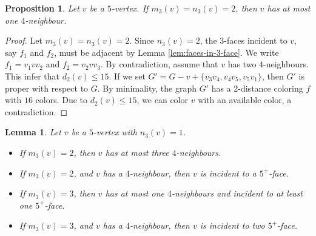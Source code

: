 \documentclass[12pt, reqno]{amsart}
\theoremstyle{plain}
\newtheorem{proposition}[equation]{Proposition}
\newtheorem{lemma}[equation]{Lemma}
\theoremstyle{definition}
\numberwithin{equation}{section}
\begin{document}
\begin{proposition}\label{prop:  v has two 4 neighbour}
Let $v$ be a $5$-vertex. If $m_3(v)=n_3(v)= 2$, then $v$ has at  most one $4$-neighbour. 
\end{proposition}
\begin{proof}
Let $m_3(v)=n_3(v)= 2$.  Since  $n_3(v)= 2$, the $3$-faces incident to $v$, say $f_1$ and $f_2$, must be adjacent by Lemma \ref{lem:faces-in-3-face}. We write  $f_1=v_1vv_2$ and $f_2=v_2vv_3$. By contradiction, assume that $v$ has two $4$-neighbours. This infer that $d_2(v)\leq 15$. If we set $G'=G-v+\{v_3v_4,v_4v_5,v_5v_1\}$, then $G'$ is proper with respect to $G$. By minimality, the graph $G'$ has a 2-distance coloring $f$ with $16$ colors. Due to $d_2(v)\leq 15$, we can color $v$ with an available color, a contradiction. 
\end{proof}




\begin{lemma}\label{lem:5-vertex-three-4-neigh}
Let $v$ be a $5$-vertex with  $n_3(v)= 1$. 
\begin{itemize}
\item[$(a)$] If $m_3(v)=2$, then $v$ has at  most three $4$-neighbours. 
\item[$(b)$] If $m_3(v)=2$, and $v$ has a $4$-neighbour, then  $v$ is incident to a $5^+$-face. 
\item[$(c)$] If $m_3(v)=3$, then  $v$ has at  most one $4$-neighbours and incident to at least one $5^+$-face.
\item[$(d)$] If $m_3(v)=3$, and $v$ has a $4$-neighbour, then  $v$ is incident to two $5^+$-face.
\end{itemize}
\end{lemma}
\end{document}
